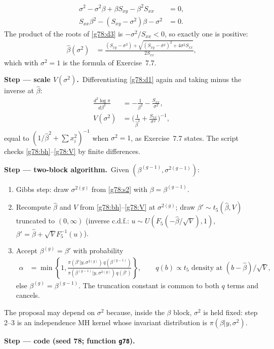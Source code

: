\documentclass[11pt,a4paper]{article}
\newcommand{\passo}[2]{\par\smallskip\noindent\textbf{Step --- #1.}~#2}
\begin{document}
\begin{sol}
{\begin{align}
\sigma^2-\sigma^2\beta+\beta S_{xy}-\beta^2S_{xx}&=0,\label{g78:d2}\\
S_{xx}\beta^2-(S_{xy}-\sigma^2)\beta-\sigma^2&=0.\label{g78:d3}
\end{align}
The product of the roots of \eqref{g78:d3} is $-\sigma^2/S_{xx}<0$, so exactly one is positive:
\begin{align}
\hat\beta(\sigma^2)&=\frac{(S_{xy}-\sigma^2)+\sqrt{(S_{xy}-\sigma^2)^2+4\sigma^2S_{xx}}}{2S_{xx}},\label{g78:bh}
\end{align}
which with $\sigma^2=1$ is the formula of Exercise~7.7.}
\passo{scale $V(\sigma^2)$}{Differentiating \eqref{g78:d1} again and taking minus the inverse at $\hat\beta$:
\begin{align}
\frac{d^2\log\pi}{d\beta^2}&=-\frac{1}{\beta^2}-\frac{S_{xx}}{\sigma^2},\label{g78:d2b}\\
V(\sigma^2)&=\Big(\frac{1}{\hat\beta^2}+\frac{S_{xx}}{\sigma^2}\Big)^{-1},\label{g78:V}
\end{align}
equal to $(1/\hat\beta^2+\sum x_i^2)^{-1}$ when $\sigma^2=1$, as Exercise~7.7 states. The script checks \eqref{g78:bh}--\eqref{g78:V} by finite differences.}
\passo{two-block algorithm}{Given $(\beta^{(g-1)},\sigma^{2(g-1)})$:
\begin{enumerate}[leftmargin=2em]
\item Gibbs step: draw $\sigma^{2(g)}$ from \eqref{g78:s2} with $\beta=\beta^{(g-1)}$.
\item Recompute $\hat\beta$ and $V$ from \eqref{g78:bh}--\eqref{g78:V} at $\sigma^{2(g)}$; draw $\beta'\sim t_5(\hat\beta,V)$ truncated to $(0,\infty)$ (inverse c.d.f.: $u\sim U(F_5(-\hat\beta/\sqrt V),1)$, $\beta'=\hat\beta+\sqrt V F_5^{-1}(u)$).
\item Accept $\beta^{(g)}=\beta'$ with probability
\begin{align}
\alpha&=\min\left\{1,\frac{\pi(\beta'|y,\sigma^{2(g)})\,q(\beta^{(g-1)})}{\pi(\beta^{(g-1)}|y,\sigma^{2(g)})\,q(\beta')}\right\},\qquad q(b)\propto t_5\text{ density at }(b-\hat\beta)/\sqrt V,\label{g78:acc}
\end{align}
else $\beta^{(g)}=\beta^{(g-1)}$. The truncation constant is common to both $q$ terms and cancels.
\end{enumerate}
The proposal may depend on $\sigma^2$ because, inside the $\beta$ block, $\sigma^2$ is held fixed: step 2--3 is an independence MH kernel whose invariant distribution is $\pi(\beta|y,\sigma^2)$.}
\passo{code (seed 78; function \texttt{g78})}{}

\end{sol}
\end{document}
